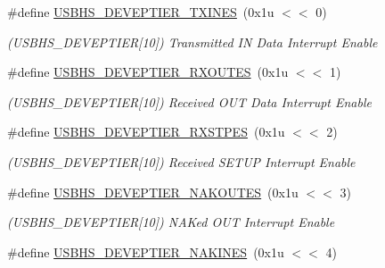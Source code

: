 \begin{DoxyCompactItemize}
\#define \mbox{\hyperlink{group__SAME70__USBHS_gadaf4a6b6fc4cd4f3ccb9f038c0dd961c}{U\+S\+B\+H\+S\+\_\+\+D\+E\+V\+E\+P\+T\+I\+E\+R\+\_\+\+T\+X\+I\+N\+ES}}~(0x1u $<$$<$ 0)
\begin{DoxyCompactList}\small\item\em (U\+S\+B\+H\+S\+\_\+\+D\+E\+V\+E\+P\+T\+I\+ER\mbox{[}10\mbox{]}) Transmitted IN Data Interrupt Enable \end{DoxyCompactList}\item 
\mbox{\label{group__SAME70__USBHS_ga4c5b287a879e1d4f9a02bbe5a17c8114}} 
\#define \mbox{\hyperlink{group__SAME70__USBHS_ga4c5b287a879e1d4f9a02bbe5a17c8114}{U\+S\+B\+H\+S\+\_\+\+D\+E\+V\+E\+P\+T\+I\+E\+R\+\_\+\+R\+X\+O\+U\+T\+ES}}~(0x1u $<$$<$ 1)
\begin{DoxyCompactList}\small\item\em (U\+S\+B\+H\+S\+\_\+\+D\+E\+V\+E\+P\+T\+I\+ER\mbox{[}10\mbox{]}) Received O\+UT Data Interrupt Enable \end{DoxyCompactList}\item 
\mbox{\label{group__SAME70__USBHS_ga5a663a7ed6edeebe0935d7497d01b728}} 
\#define \mbox{\hyperlink{group__SAME70__USBHS_ga5a663a7ed6edeebe0935d7497d01b728}{U\+S\+B\+H\+S\+\_\+\+D\+E\+V\+E\+P\+T\+I\+E\+R\+\_\+\+R\+X\+S\+T\+P\+ES}}~(0x1u $<$$<$ 2)
\begin{DoxyCompactList}\small\item\em (U\+S\+B\+H\+S\+\_\+\+D\+E\+V\+E\+P\+T\+I\+ER\mbox{[}10\mbox{]}) Received S\+E\+T\+UP Interrupt Enable \end{DoxyCompactList}\item 
\mbox{\label{group__SAME70__USBHS_ga24822d471dea7d8a4be842541b6ef704}} 
\#define \mbox{\hyperlink{group__SAME70__USBHS_ga24822d471dea7d8a4be842541b6ef704}{U\+S\+B\+H\+S\+\_\+\+D\+E\+V\+E\+P\+T\+I\+E\+R\+\_\+\+N\+A\+K\+O\+U\+T\+ES}}~(0x1u $<$$<$ 3)
\begin{DoxyCompactList}\small\item\em (U\+S\+B\+H\+S\+\_\+\+D\+E\+V\+E\+P\+T\+I\+ER\mbox{[}10\mbox{]}) N\+A\+Ked O\+UT Interrupt Enable \end{DoxyCompactList}\item 
\mbox{\label{group__SAME70__USBHS_ga931a5b704dfa8cfeee1cb5650f32d991}} 
\#define \mbox{\hyperlink{group__SAME70__USBHS_ga931a5b704dfa8cfeee1cb5650f32d991}{U\+S\+B\+H\+S\+\_\+\+D\+E\+V\+E\+P\+T\+I\+E\+R\+\_\+\+N\+A\+K\+I\+N\+ES}}~(0x1u $<$$<$ 4)
$$
\end{DoxyCompactItemize}
